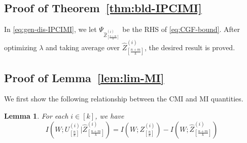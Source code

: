 \documentclass[onecolumn,romanappendices,10pt]{IEEEtran}
\newtheorem{lemma}{Lemma}
\begin{document}
	\subsection{Proof of Theorem~\ref{thm:bld-IPCIMI}}
	In \eqref{eq:gen-dis-IPCIMI}, we let $\Psi_{\hat{Z}^{(i)}_{[\frac{n+m}{k}]}}$ be the RHS of \eqref{eq:CGF-bound}. After optimizing $\lambda$ and taking average over $\hat{Z}^{(i)}_{[\frac{n+m}{k}]}$, the desired result is proved.
	
	\subsection{Proof of Lemma~\ref{lem:lim-MI}} \label{appsub:lemma3}
	We first show the following relationship between the CMI and MI quantities.
	\begin{lemma} \label{lem:ineq-CMI-MI}
		For each $i \in [k]$, we have
		\begin{equation}
			I\left( W; U^{(i)}_{[\frac{n}{k}]} | \hat{Z}^{(i)}_{[\frac{n+m}{k}]} \right) = I\left( W; Z^{(i)}_{[\frac{n}{k}]} \right) - I\left( W; \hat{Z}^{(i)}_{[\frac{n+m}{k}]} \right)
			\label{eq:ineq-CMI-MI}
		\end{equation}
	\end{lemma}
	
\end{document}

